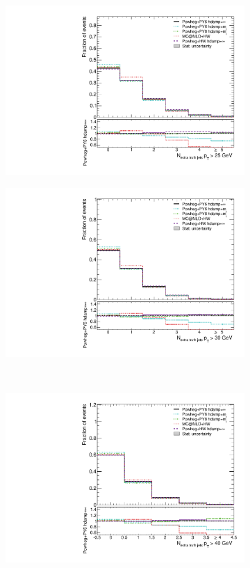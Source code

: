 \begin{figure}
\centering
\begin{subfigure}[]{0.45\textwidth}
\includegraphics[width=\textwidth]{fig/MCComp/NLO/NTruthExtraJets25.pdf}
\end{subfigure}
\begin{subfigure}[]{0.45\textwidth}
\includegraphics[width=\textwidth]{fig/MCComp/NLO/NTruthExtraJets30.pdf}
\end{subfigure}
\\
\begin{subfigure}[]{0.45\textwidth}
\includegraphics[width=\textwidth]{fig/MCComp/NLO/NTruthExtraJets40.pdf}

\end{subfigure}
\end{figure}
